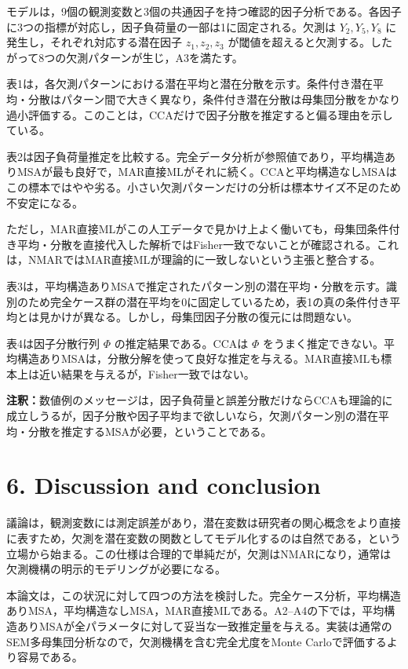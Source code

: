 \documentclass[dvipdfmx,autodetect-engine]{jsarticle}
\newcommand{\note}[1]{\par\smallskip\noindent\textbf{注釈：}#1\par\smallskip}
\begin{document}
モデルは，9個の観測変数と3個の共通因子を持つ確認的因子分析である。各因子に3つの指標が対応し，因子負荷量の一部は1に固定される。欠測は $Y_2,Y_5,Y_8$ に発生し，それぞれ対応する潜在因子 $z_1,z_2,z_3$ が閾値を超えると欠測する。したがって8つの欠測パターンが生じ，A3を満たす。

表1は，各欠測パターンにおける潜在平均と潜在分散を示す。条件付き潜在平均・分散はパターン間で大きく異なり，条件付き潜在分散は母集団分散をかなり過小評価する。このことは，CCAだけで因子分散を推定すると偏る理由を示している。

表2は因子負荷量推定を比較する。完全データ分析が参照値であり，平均構造ありMSAが最も良好で，MAR直接MLがそれに続く。CCAと平均構造なしMSAはこの標本ではやや劣る。小さい欠測パターンだけの分析は標本サイズ不足のため不安定になる。

ただし，MAR直接MLがこの人工データで見かけ上よく働いても，母集団条件付き平均・分散を直接代入した解析ではFisher一致でないことが確認される。これは，NMARではMAR直接MLが理論的に一致しないという主張と整合する。

表3は，平均構造ありMSAで推定されたパターン別の潜在平均・分散を示す。識別のため完全ケース群の潜在平均を0に固定しているため，表1の真の条件付き平均とは見かけが異なる。しかし，母集団因子分散の復元には問題ない。

表4は因子分散行列 $\Phi$ の推定結果である。CCAは $\Phi$ をうまく推定できない。平均構造ありMSAは，分散分解を使って良好な推定を与える。MAR直接MLも標本上は近い結果を与えるが，Fisher一致ではない。

\note{数値例のメッセージは，因子負荷量と誤差分散だけならCCAも理論的に成立しうるが，因子分散や因子平均まで欲しいなら，欠測パターン別の潜在平均・分散を推定するMSAが必要，ということである。}

\section{6. Discussion and conclusion}

議論は，観測変数には測定誤差があり，潜在変数は研究者の関心概念をより直接に表すため，欠測を潜在変数の関数としてモデル化するのは自然である，という立場から始まる。この仕様は合理的で単純だが，欠測はNMARになり，通常は欠測機構の明示的モデリングが必要になる。

本論文は，この状況に対して四つの方法を検討した。完全ケース分析，平均構造ありMSA，平均構造なしMSA，MAR直接MLである。A2--A4の下では，平均構造ありMSAが全パラメータに対して妥当な一致推定量を与える。実装は通常のSEM多母集団分析なので，欠測機構を含む完全尤度をMonte Carloで評価するより容易である。
\end{document}
